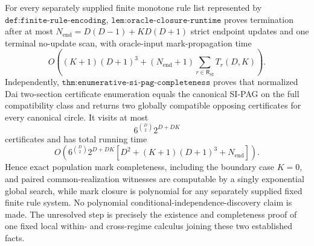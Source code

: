 For every separately supplied finite monotone rule list represented by \(\texttt{def:finite-rule-encoding}\), \(\texttt{lem:oracle-closure-runtime}\) proves termination after at most \(N_{\mathrm{end}}=D(D-1)+KD(D+1)\) strict endpoint updates and one terminal no-update scan, with oracle-input mark-propagation time
\[
O\!\left((K+1)(D+1)^3+(N_{\mathrm{end}}+1)\sum_{r\in\mathsf R_{\mathrm{SI}}}T_r(D,K)\right).
\]
Independently, \(\texttt{thm:enumerative-si-pag-completeness}\) proves that normalized Dai two-section certificate enumeration equals the canonical SI-PAG on the full compatibility class and returns two globally compatible opposing certificates for every canonical circle. It visits at most
\[
6^{\binom D2}2^{D+DK}
\]
certificates and has total running time
\[
O\!\left(6^{\binom D2}2^{D+DK}\left[D^2+(K+1)(D+1)^3+N_{\mathrm{end}}\right]\right).
\]
Hence exact population mark completeness, including the boundary case \(K=0\), and paired common-realization witnesses are computable by a singly exponential global search, while mark closure is polynomial for any separately supplied fixed finite rule system. No polynomial conditional-independence-discovery claim is made. The unresolved step is precisely the existence and completeness proof of one fixed local within- and cross-regime calculus joining these two established facts.